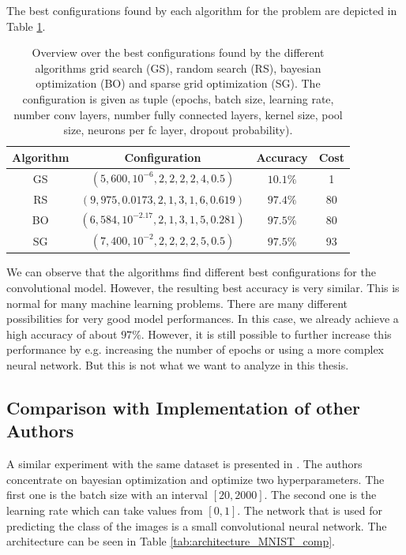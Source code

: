 The best configurations found by each algorithm for the problem are depicted in Table \ref{tab:best_configurations_MNIST}.

\begin{table}[H]
	\caption{ Overview over the best configurations found by the different algorithms grid search (GS), random search (RS), bayesian optimization (BO) and sparse grid optimization (SG). The configuration is given as tuple (epochs, batch size, learning rate, number conv layers, number fully connected layers, kernel size, pool size, neurons per fc layer, dropout probability). }
	\label{tab:best_configurations_MNIST}
	\centering
	\begin{tabular}{| c c c c |} 
		\hline
		Algorithm & Configuration & Accuracy & Cost \\ 
		\hline
		GS & $ (5, 600, 10^{-6}, 2, 2, 2, 2, 4, 0.5) $ & $ 10.1\% $ & 1 \\ 
		RS & $ (9, 975, 0.0173, 2, 1, 3, 1, 6, 0.619) $ & $ 97.4\% $ & 80 \\ 
		BO & $ (6, 584, 10^{-2.17}, 2, 1, 3, 1, 5, 0.281) $ & $ 97.5\% $ & 80 \\ 
		SG & $ (7, 400, 10^{-2}, 2, 2, 2, 2, 5, 0.5) $ & $ 97.5\% $ & 93 \\ 
		\hline
	\end{tabular}
\end{table}

We can observe that the algorithms find different best configurations for the convolutional model. However, the resulting best accuracy is very similar. This is normal for many machine learning problems. There are many different possibilities for very good model performances. In this case, we already achieve a high accuracy of about $ 97\% $. However, it is still possible to further increase this performance by e.g. increasing the number of epochs or using a more complex neural network. But this is not what we want to analyze in this thesis. 

\subsection{Comparison with Implementation of other Authors}

A similar experiment with the same dataset is presented in \cite{WU201926}. The authors concentrate on bayesian optimization and optimize two hyperparameters. The first one is the batch size with an interval $ [20, 2000] $. The second one is the learning rate which can take values from $ [0,1] $. The network that is used for predicting the class of the images is a small convolutional neural network. The architecture can be seen in Table \ref{tab:architecture_MNIST_comp}.


